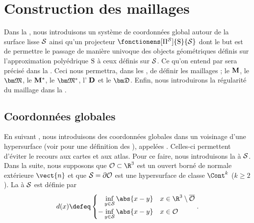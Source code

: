 \section{Construction des maillages \ddfv} \label{sec:construction_of_the_ddfv_meshes}

Dans la , nous introduisons un système de coordonnées global autour de la surface lisse $\mathcal{S}$ ainsi qu'un projecteur $\fonctionens[\projvariete]{\surfpoly}{\surflisse}$ dont le but est de permettre le passage de manière univoque des objects géométriques définis sur l'approximation polyédrique $\mathrm{S}$ à ceux définis sur $\mathcal{S}$. Ce qu'on entend par  sera précisé dans la . Ceci nous permettra, dans les , de définir les maillages \ddfv; le  $\mathbf{M}$, le  $\ensprimal$, le  ${\mathbf{M}^\ast}$, le  $\ensdual$, l' $\mathbf{D}$ et le  $\ensdiamant$. Enfin, nous introduirons la régularité du maillage \ddfv dans la .

\subsection{Coordonnées globales} \label{sec:hypothesis_on_the_surface_and_projection}

En suivant \cite[Section 2.3]{dziuk_finite_2013}, nous introduisons des coordonnées globales dans un voisinage d'une hypersurface (voir \cite[Section 2.2]{dziuk_finite_2013} pour une définition des ), appelées . Celles-ci permettent d'éviter le recours aux cartes et aux atlas. Pour ce faire, nous introduisons la  à $\mathcal{S}$. Dans la suite, nous supposons que $\mathcal{O} \subset \R^{3}$ est un ouvert borné de normale extérieure $\vect{n}$ et que $\mathcal{S} = \partial \mathcal{O}$ est une hypersurface de classe $\Cont^k$ ($k \geqslant 2$). La  à $\mathcal{S}$ est définie par
\begin{equation} \label{eq:def_oriented_distance}
d(x) \defeq \begin{cases}
\phantom{-} \inf\limits_{y \in \surflisse} \abs{x - y} & x \in \R^{3} \setminus \overline{\mathcal{O}} \\
- \inf\limits_{y \in \surflisse} \abs{x - y} & x \in \mathcal{O}
\end{cases}.
\end{equation}

